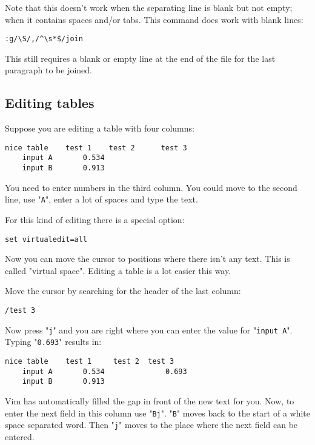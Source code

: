 Note that this doesn't work when the separating line is blank but not empty; when it contains spaces and/or tabs.
This command does work with blank lines:

\begin{Verbatim}[samepage=true]
 :g/\S/,/^\s*$/join
\end{Verbatim}

This still requires a blank or empty line at the end of the file for the last paragraph to be joined.
\subsection{Editing tables}
Suppose you are editing a table with four columns:

\begin{Verbatim}[samepage=true]
    nice table    test 1    test 2      test 3 
    input A       0.534 
    input B       0.913 
\end{Verbatim}

You need to enter numbers in the third column.
You could move to the second line, use "\verb!A!", enter a lot of spaces and type the text.

For this kind of editing there is a special option:

\begin{Verbatim}[samepage=true]
 set virtualedit=all
\end{Verbatim}

Now you can move the cursor to positions where there isn't any text.
This is called "virtual space".
Editing a table is a lot easier this way.

Move the cursor by searching for the header of the last column:

\begin{Verbatim}[samepage=true]
 /test 3
\end{Verbatim}

Now press "\verb!j!" and you are right where you can enter the value for "\verb!input A!".
Typing "\verb!0.693!" results in:

\begin{Verbatim}[samepage=true]
    nice table    test 1     test 2  test 3 
    input A       0.534              0.693 
    input B       0.913 
\end{Verbatim}

Vim has automatically filled the gap in front of the new text for you.
Now, to enter the next field in this column use "\verb!Bj!".
"\verb!B!" moves back to the start of a white space separated word.
Then "\verb!j!" moves to the place where the next field can be entered.

